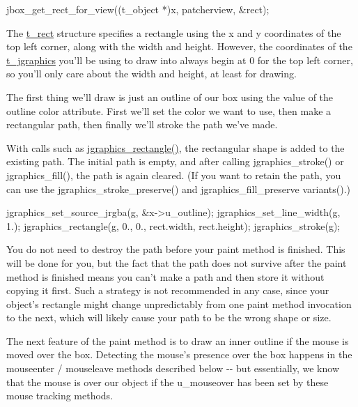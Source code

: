\begin{DoxyCode}
    jbox_get_rect_for_view((t_object *)x, patcherview, &rect);
\end{DoxyCode}


The \hyperlink{structt__rect}{t\_\-rect} structure specifies a rectangle using the x and y coordinates of the top left corner, along with the width and height. However, the coordinates of the \hyperlink{group__jgraphics_ga4bf27bd7e21a59a427481b909d4656e7}{t\_\-jgraphics} you'll be using to draw into always begin at 0 for the top left corner, so you'll only care about the width and height, at least for drawing.

The first thing we'll draw is just an outline of our box using the value of the outline color attribute. First we'll set the color we want to use, then make a rectangular path, then finally we'll stroke the path we've made.

With calls such as \hyperlink{group__jgraphics_ga01f63358f24616678d69721d7d505e74}{jgraphics\_\-rectangle()}, the rectangular shape is added to the existing path. The initial path is empty, and after calling jgraphics\_\-stroke() or jgraphics\_\-fill(), the path is again cleared. (If you want to retain the path, you can use the jgraphics\_\-stroke\_\-preserve() and jgraphics\_\-fill\_\-preserve variants().)


\begin{DoxyCode}
    jgraphics_set_source_jrgba(g, &x->u_outline);
    jgraphics_set_line_width(g, 1.);
    jgraphics_rectangle(g, 0., 0., rect.width, rect.height);
    jgraphics_stroke(g);
\end{DoxyCode}


You do not need to destroy the path before your paint method is finished. This will be done for you, but the fact that the path does not survive after the paint method is finished means you can't make a path and then store it without copying it first. Such a strategy is not recommended in any case, since your object's rectangle might change unpredictably from one paint method invocation to the next, which will likely cause your path to be the wrong shape or size.

The next feature of the paint method is to draw an inner outline if the mouse is moved over the box. Detecting the mouse's presence over the box happens in the mouseenter / mouseleave methods described below -\/-\/ but essentially, we know that the mouse is over our object if the u\_\-mouseover has been set by these mouse tracking methods.

